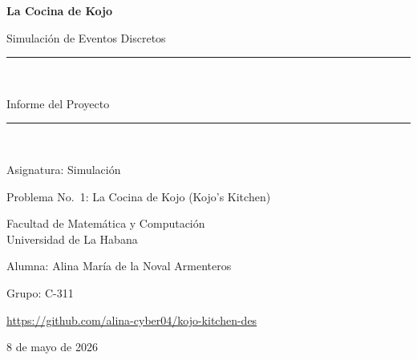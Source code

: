 \documentclass[12pt,a4paper]{article}
\begin{document}

\hypersetup{pageanchor=false}
\begin{titlepage}
  \centering
  \vspace*{2cm}
  {\LARGE\bfseries La Cocina de Kojo\par}
  \vspace{0.5cm}
  {\large Simulación de Eventos Discretos\par}
  \vspace{2cm}
  \rule{\linewidth}{0.5pt}\\[0.4cm]
  {\large Informe del Proyecto\par}
  \rule{\linewidth}{0.5pt}\\[1.5cm]
  {\large Asignatura: Simulación\par}
  \vspace{0.4cm}
  {\normalsize Problema No.\ 1: La Cocina de Kojo (Kojo's Kitchen)\par}
  \vspace{1cm}
  {\normalsize Facultad de Matemática y Computación\\
   Universidad de La Habana\par}
  \vspace{1cm}
  {\normalsize Alumna: Alina María de la Noval Armenteros\par}
  \vspace{0.3cm}
  {\normalsize Grupo: C-311\par}
  \vspace{0.3cm}
  {\normalsize \url{https://github.com/alina-cyber04/kojo-kitchen-des}\par}
  \vspace{0.7cm}
  {\normalsize 8 de mayo de 2026\par}
  \vfill
\end{titlepage}

\tableofcontents
\newpage
\hypersetup{pageanchor=true}


\newpage

\newpage

\newpage

\newpage


\newpage


\end{document}
